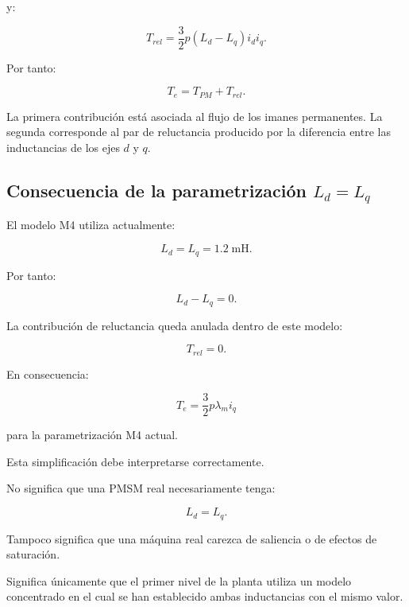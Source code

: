 y:

\begin{equation}
T_{rel}
=
\frac{3}{2}p(L_d-L_q)i_di_q.
\end{equation}

Por tanto:

\begin{equation}
T_e=T_{PM}+T_{rel}.
\end{equation}

La primera contribución está asociada al flujo de los imanes permanentes. La segunda corresponde al par de reluctancia producido por la diferencia entre las inductancias de los ejes $d$ y $q$.

\subsection{\texorpdfstring{Consecuencia de la parametrización $L_d=L_q$}{Consecuencia de la parametrización Ld = Lq}}

El modelo M4 utiliza actualmente:

\begin{equation}
L_d=L_q=1.2\;\mathrm{mH}.
\end{equation}

Por tanto:

\begin{equation}
L_d-L_q=0.
\end{equation}

La contribución de reluctancia queda anulada dentro de este modelo:

\begin{equation}
T_{rel}=0.
\end{equation}

En consecuencia:

\begin{equation}
\boxed{
T_e=
\frac{3}{2}p\lambda_mi_q
}
\end{equation}

para la parametrización M4 actual.

Esta simplificación debe interpretarse correctamente.

No significa que una PMSM real necesariamente tenga:

\begin{equation}
L_d=L_q.
\end{equation}

Tampoco significa que una máquina real carezca de saliencia o de efectos de saturación.

Significa únicamente que el primer nivel de la planta utiliza un modelo concentrado en el cual se han establecido ambas inductancias con el mismo valor.

